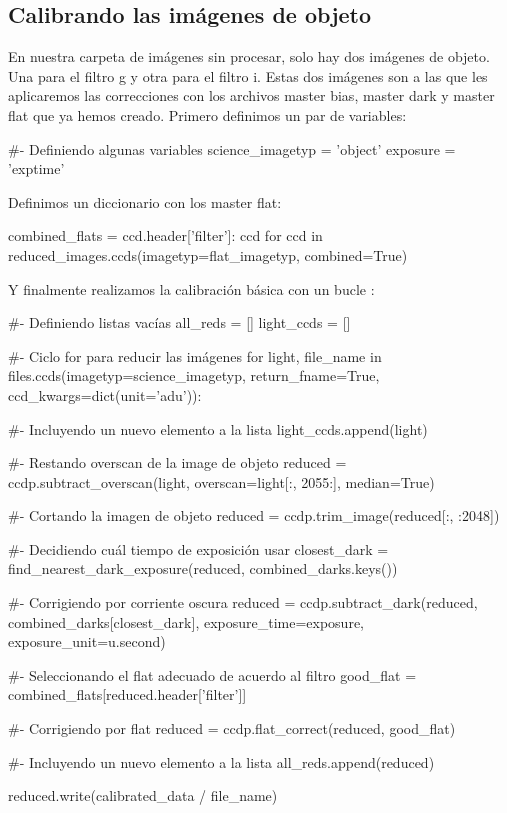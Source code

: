  \subsection{Calibrando las imágenes de objeto}
En nuestra carpeta de imágenes sin procesar, solo hay dos imágenes de objeto. Una para el filtro g y otra para el filtro i. Estas dos imágenes son a las que les aplicaremos las correcciones con los archivos master bias, master dark y master flat que ya hemos creado. Primero definimos un par de variables:

\begin{pyin}[]
#- Definiendo algunas variables
science_imagetyp = 'object'
exposure = 'exptime'
\end{pyin} 

Definimos un diccionario con los master flat:
\begin{pyin}
combined_flats = {ccd.header['filter']: ccd for ccd in reduced_images.ccds(imagetyp=flat_imagetyp, combined=True)}
\end{pyin}

Y finalmente realizamos la calibración básica con un bucle :

\begin{pyin}[]
#- Definiendo listas vacías
all_reds = []
light_ccds = []

#- Ciclo for para reducir las imágenes
for light, file_name in files.ccds(imagetyp=science_imagetyp, return_fname=True, ccd_kwargs=dict(unit='adu')):

    #- Incluyendo un nuevo elemento a la lista
    light_ccds.append(light)
    
    #- Restando overscan de la image de objeto
    reduced = ccdp.subtract_overscan(light, overscan=light[:, 2055:], median=True)
    
    #- Cortando la imagen de objeto
    reduced = ccdp.trim_image(reduced[:, :2048])

    #- Decidiendo cuál tiempo de exposición usar
    closest_dark = find_nearest_dark_exposure(reduced, combined_darks.keys())

    #- Corrigiendo por corriente oscura
    reduced = ccdp.subtract_dark(reduced, combined_darks[closest_dark],
                                 exposure_time=exposure, exposure_unit=u.second)
    
    #- Seleccionando el flat adecuado de acuerdo al filtro
    good_flat = combined_flats[reduced.header['filter']]

    #- Corrigiendo por flat
    reduced = ccdp.flat_correct(reduced, good_flat)

    #- Incluyendo un nuevo elemento a la lista
    all_reds.append(reduced)

    reduced.write(calibrated_data / file_name)
\end{pyin}
 
